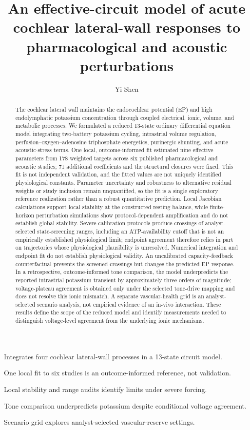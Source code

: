\documentclass[final,5p,times]{elsarticle}
\title{An effective-circuit model of acute cochlear lateral-wall responses to pharmacological and acoustic perturbations}
\author[uw]{Yi Shen\corref{cor1}}
\begin{document}
\begin{frontmatter}

\begin{highlights}
\item Integrates four cochlear lateral-wall processes in a 13-state circuit model.
\item One local fit to six studies is an outcome-informed reference, not validation.
\item Local stability and range audits identify limits under severe forcing.
\item Tone comparison underpredicts potassium despite conditional voltage agreement.
\item Scenario grid explores analyst-selected vascular-reserve settings.
\end{highlights}

\begin{abstract}
The cochlear lateral wall maintains the endocochlear potential (EP) and high endolymphatic potassium concentration through coupled electrical, ionic, volume, and metabolic processes. We formulated a reduced 13-state ordinary differential equation model integrating two-battery potassium cycling, intrastrial volume regulation, perfusion--oxygen--adenosine triphosphate energetics, purinergic shunting, and acute acoustic-stress terms. One local, outcome-informed fit estimated nine effective parameters from 178 weighted targets across six published pharmacological and acoustic studies; 71 additional coefficients and the structural closures were fixed. This fit is not independent validation, and the fitted values are not uniquely identified physiological constants. Parameter uncertainty and robustness to alternative residual weights or study inclusion remain unquantified, so the fit is a single exploratory reference realization rather than a robust quantitative prediction. Local Jacobian calculations support local stability at the constructed resting balance, while finite-horizon perturbation simulations show protocol-dependent amplification and do not establish global stability. Severe calibration protocols produce crossings of analyst-selected state-screening ranges, including an ATP-availability cutoff that is not an empirically established physiological limit; endpoint agreement therefore relies in part on trajectories whose physiological plausibility is unresolved. Numerical integration and endpoint fit do not establish physiological validity. An uncalibrated capacity-feedback counterfactual prevents the screened crossings but changes the predicted EP response. In a retrospective, outcome-informed tone comparison, the model underpredicts the reported intrastrial potassium transient by approximately three orders of magnitude; voltage-plateau agreement is obtained only under the selected tone-drive mapping and does not resolve this ionic mismatch. A separate vascular-health grid is an analyst-selected scenario analysis, not empirical evidence of an in-vivo interaction. These results define the scope of the reduced model and identify measurements needed to distinguish voltage-level agreement from the underlying ionic mechanisms.
\end{abstract}


\end{frontmatter}
\end{document}
